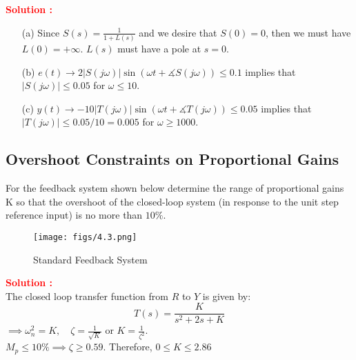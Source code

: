 \documentclass[12pt]{article}
\begin{document}
\textbf{\textcolor{red}{Solution :}}

\begin{itemize}
    \item[(a)] Since $S(s) = \frac{1}{1+L(s)}$ and we desire that $S(0)=0$, then we must have $L(0) = +\infty$. $L(s)$ must have a pole at $s=0$.
    \item[(b)] $e(t) \rightarrow 2 |S(j \omega)| \sin(\omega t + \measuredangle S(j \omega)) \leq 0.1$ implies that $|S(j \omega)| \leq 0.05$ for $\omega \leq 10$.
    \item[(c)] $y(t) \rightarrow - 10 |T(j \omega)| \sin(\omega t + \measuredangle T(j\omega)) \leq 0.05$ implies that $|T(j \omega)| \leq 0.05/10 = 0.005$ for $\omega \geq 1000$.
\end{itemize}

\clearpage
\subsection{Overshoot Constraints on Proportional Gains}
For the feedback system shown below determine the range of proportional gains K so that the overshoot of the closed-loop system (in response to the unit step reference input) is no more than $10\%$. \\

\begin{figure}[h!]
    \centering
    \texttt{[image: figs/4.3.png]}
    \caption{Standard Feedback System}
    \label{fig:prb36}
\end{figure}
\textbf{\textcolor{red}{Solution :}} \\

\noindent The closed loop transfer function from $R$ to $Y$ is given by:
\[
T(s)=\frac{K}{s^2 + 2s + K}
\]
$\implies \omega_n^2=K, \quad \zeta=\frac{1}{\sqrt{K}} $ or $K=\frac{1}{\zeta^2}$.\\
$M_p \leq 10\% \implies \zeta \geq 0.59$. Therefore, $0 \leq  K \leq 2.86$

\clearpage
\end{document}
